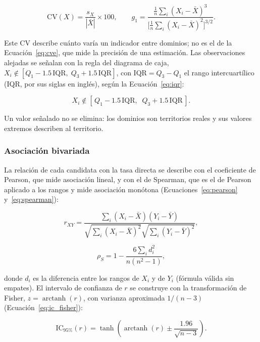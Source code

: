 \begin{equation}
    \text{CV}(X) = \frac{s_X}{|\bar{X}|}\times 100, \qquad g_1 = \frac{\frac{1}{n}\sum_{i}(X_i-\bar{X})^3}{\big[\frac{1}{n}\sum_{i}(X_i-\bar{X})^2\big]^{3/2}} .
    \label{eq:cv_descriptivo}
\end{equation}

Este CV describe cuánto varía un indicador entre dominios; no es el de la Ecuación~\ref{eq:cve}, que mide la precisión de una estimación. Las observaciones alejadas se señalan con la regla del diagrama de caja, $X_i \notin [Q_1 - 1.5\,\text{IQR},\; Q_3 + 1.5\,\text{IQR}]$, con $\text{IQR} = Q_3 - Q_1$ el rango intercuartílico (IQR, por sus siglas en inglés), según la Ecuación~\ref{eq:iqr}:

\begin{equation}
    X_i \notin \left[\,Q_1 - 1.5\,\text{IQR},\;\; Q_3 + 1.5\,\text{IQR}\,\right].
    \label{eq:iqr}
\end{equation}

Un valor señalado no se elimina: los dominios son territorios reales y sus valores extremos describen al territorio.

\subsubsection{Asociación bivariada}

La relación de cada candidata con la tasa directa se describe con el coeficiente de Pearson, que mide asociación lineal, y con el de Spearman, que es el de Pearson aplicado a los rangos y mide asociación monótona (Ecuaciones~\ref{eq:pearson} y~\ref{eq:spearman}):

\begin{equation}
    r_{XY} = \frac{\sum_{i}(X_i-\bar{X})(Y_i-\bar{Y})}{\sqrt{\sum_{i}(X_i-\bar{X})^2}\sqrt{\sum_{i}(Y_i-\bar{Y})^2}},
    \label{eq:pearson}
\end{equation}

\begin{equation}
    \rho_S = 1 - \frac{6\sum_{i} d_i^2}{n(n^2-1)},
    \label{eq:spearman}
\end{equation}

donde $d_i$ es la diferencia entre los rangos de $X_i$ y de $Y_i$ (fórmula válida sin empates). El intervalo de confianza de $r$ se construye con la transformación de Fisher, $z = \operatorname{arctanh}(r)$, con varianza aproximada $1/(n-3)$ (Ecuación~\ref{eq:ic_fisher}):

\begin{equation}
    \text{IC}_{95\%}(r) = \tanh\!\left(\operatorname{arctanh}(r) \pm \frac{1.96}{\sqrt{n-3}}\right).
    \label{eq:ic_fisher}
\end{equation}

